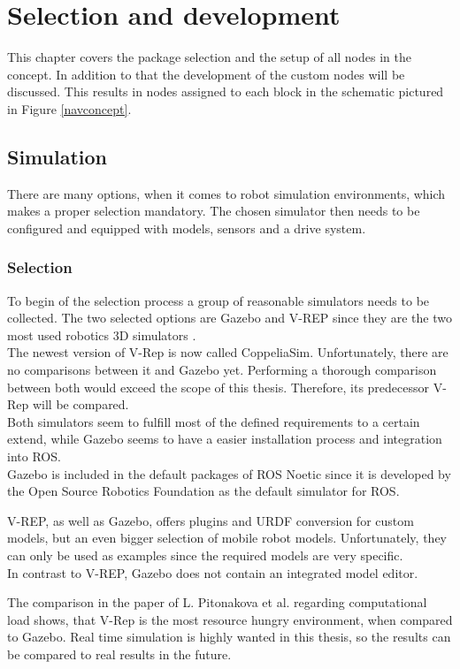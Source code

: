 \chapter{Selection and development}
\label{Selection}

This chapter covers the package selection and the setup of all nodes in the concept. In addition to that the development of the custom nodes will be discussed. This results in nodes assigned to each block in the schematic pictured in Figure \ref{navconcept}.


\section{Simulation}
There are many options, when it comes to robot simulation environments, which makes a proper selection mandatory. The chosen simulator then needs to be configured and equipped with models, sensors and a drive system.

\subsection{Selection}
To begin of the selection process a group of reasonable simulators needs to be collected. The two selected options are Gazebo and V-REP since they are the two most used robotics 3D simulators \cite{SimComp}.\\
The newest version of V-Rep is now called CoppeliaSim. Unfortunately, there are no comparisons between it and Gazebo yet. Performing a thorough comparison between both would exceed the scope of this thesis. Therefore, its predecessor V-Rep will be compared. \\

Both simulators seem to fulfill most of the defined requirements to a certain extend, while Gazebo seems to have a easier installation process and integration into ROS.\\
Gazebo is included in the default packages of ROS Noetic since it is developed by the Open Source Robotics Foundation as the default simulator for ROS\cite{ROSPkg}.

V-REP, as well as Gazebo, offers plugins and URDF conversion for custom models, but an even bigger selection of mobile robot models. Unfortunately, they can only be used as examples since the required models are very specific.\\
In contrast to V-REP, Gazebo does not contain an integrated model editor.

The comparison in the paper of L. Pitonakova et al. regarding computational load shows, that V-Rep is the most resource hungry environment, when compared to  Gazebo\cite{Pitonakova}. Real time simulation is highly wanted in this thesis, so the results can be compared to real results in the future.

